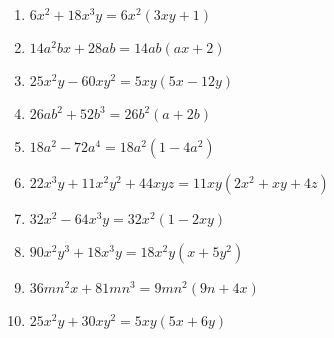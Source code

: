 {\begin{minipage}{\textwidth}
    	 \begin{enumerate}
    	 		\item $ 6x^2 + 18x^3y = 6 x^{2} \left(3 x y + 1\right)$
    	 		\item $ 14a^2bx + 28ab = 14 a b \left(a x + 2\right)
    	 		$
    	 		\item $ 25x^2y - 60xy^2 = 5 x y \left(5 x - 12 y\right)
    	 		$
    	 		\item $ 26ab^2 + 52b^3 = 26 b^{2} \left(a + 2 b\right) $
    	 		\item $ 18a^2 - 72a^4 = 18 a^{2} \left(1 - 4 a^2\right) 
    	 		$
    	 		\item $ 22x^3y + 11x^2y^2 + 44 xyz = 11 x y \left(2 x^{2} + x y + 4 z\right)
    	 		$
    	 		\item $ 32x^2 - 64x^3y = 32 x^{2} \left(1 - 2 x y\right)$
    	 		\item $ 90x^2y^3 + 18x^3y = 18 x^{2} y \left(x + 5 y^{2}\right)
    	 		$
    	 		\item $ 36mn^2x + 81mn^3 = 9 m n^{2} \left(9 n + 4 x\right)
    	 		$
    	 		\item $ 25x^2y +30xy^2 = 5 x y \left(5 x + 6 y\right)
    	 		$
    	 \end{enumerate} 
    \end{minipage}}
    
